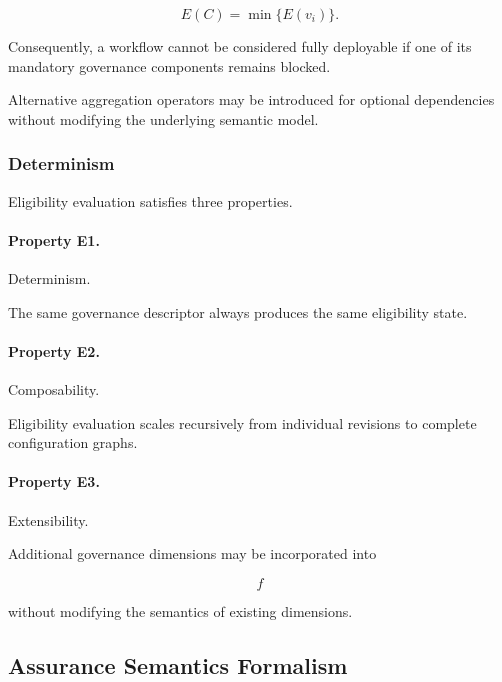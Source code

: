 \documentclass[10pt]{article}
\begin{document}
\begin{equation}
E(C)
=
\min
\{
E(v_i)
\}.
\label{eq:app_elig4}
\end{equation}

Consequently, a workflow cannot be considered fully deployable if one of its
mandatory governance components remains blocked.

Alternative aggregation operators may be introduced for optional dependencies
without modifying the underlying semantic model.

\subsubsection{Determinism}

Eligibility evaluation satisfies three properties.

\paragraph{Property E1.}

Determinism.

The same governance descriptor always produces the same eligibility state.

\paragraph{Property E2.}

Composability.

Eligibility evaluation scales recursively from individual revisions to complete
configuration graphs.

\paragraph{Property E3.}

Extensibility.

Additional governance dimensions may be incorporated into

\[
f
\]

without modifying the semantics of existing dimensions.

\subsection{Assurance Semantics Formalism}
\label{appendix:assurance_semantics}
\end{document}

